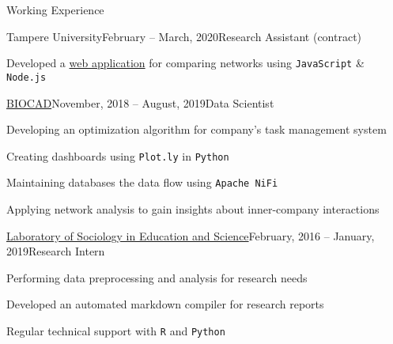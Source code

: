 \documentclass[]{resume} %
\begin{document}
\begin{rSection}{Working Experience}
    \begin{rSubsection}{Tampere University}{February -- March, 2020}{Research Assistant (contract)}{}
        \item Developed a \href{https://sigma-networks.herokuapp.com/}{web application} for comparing networks using \texttt{JavaScript} \& \texttt{Node.js}
    
    \end{rSubsection}
    
    \begin{rSubsection}{\href{https://biocadglobal.com/about_us.html}{BIOCAD}}{November, 2018 -- August, 2019}{Data Scientist}{}
        \item Developing an optimization algorithm for company's task management system
        \item Creating dashboards using \texttt{Plot.ly} in \texttt{Python}
		\item Maintaining databases the data flow using \texttt{Apache NiFi}
		\item Applying network analysis to gain insights about inner-company interactions
	\end{rSubsection}

	\begin{rSubsection}{\href{https://slon.hse.ru/en/}{Laboratory of Sociology in Education and Science}}{February, 2016 -- January, 2019}{Research Intern}{}
        \item Performing data preprocessing and analysis for research needs
        \item Developed an automated markdown compiler for research reports
		\item Regular technical support with \texttt{R} and \texttt{Python}\\[-4.3ex]
	\end{rSubsection}

\end{rSection}
\end{document}
